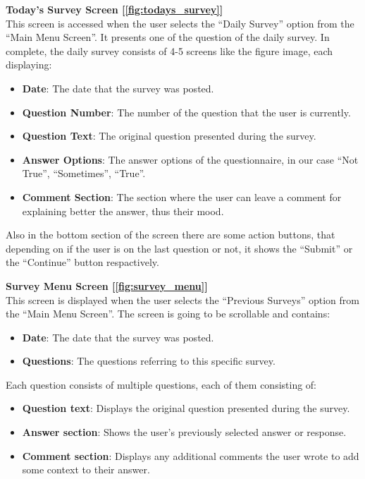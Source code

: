 \vspace{5mm}

\noindent \textbf{Today's Survey Screen [\ref{fig:todays_survey}]} \\
This screen is accessed when the user selects the ``Daily Survey'' option from the ``Main Menu Screen''. It presents one of the question of the daily survey. In complete, the daily survey consists of 4-5 screens like the figure image, each displaying:
\begin{itemize}
    \item \textbf{Date}: The date that the survey was posted.
    \item \textbf{Question Number}: The number of the question that the user is currently.
    \item \textbf{Question Text}: The original question presented during the survey.
    \item \textbf{Answer Options}: The answer options of the questionnaire, in our case ``Not True'', ``Sometimes'', ``True''.
    \item \textbf{Comment Section}: The section where the user can leave a comment for explaining better the answer, thus their mood.
\end{itemize}
\noindent Also in the bottom section of the screen there are some action buttons, that depending on if the user is on the last question or not, it shows the ``Submit'' or the ``Continue'' button respactively.

\vspace{5mm}

\noindent \textbf{Survey Menu Screen [\ref{fig:survey_menu}]} \\
This screen is displayed when the user selects the ``Previous Surveys'' option from the ``Main Menu Screen''. The screen is going to be scrollable and contains:
\begin{itemize}
    \item \textbf{Date}: The date that the survey was posted.
    \item \textbf{Questions}: The questions referring to this specific survey.
\end{itemize}
\noindent Each question consists of multiple questions, each of them consisting of:
\begin{itemize}
    \item \textbf{Question text}: Displays the original question presented during the survey.
    \item \textbf{Answer section}: Shows the user's previously selected answer or response.
    \item \textbf{Comment section}: Displays any additional comments the user wrote to add some context to their answer.
\end{itemize}

